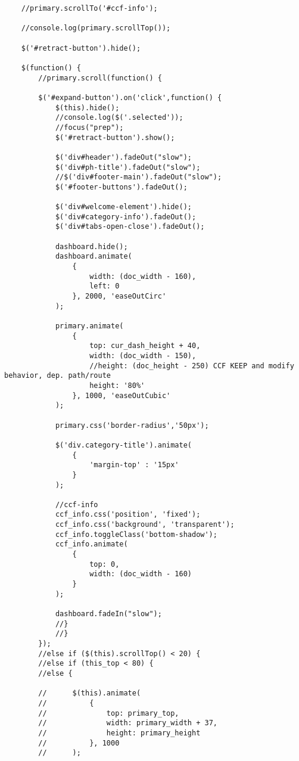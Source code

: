 \documentclass[11pt]{article}
\begin{document}
\begin{itemize}
\begin{itemize}
\begin{verbatim}
    //primary.scrollTo('#ccf-info');

    //console.log(primary.scrollTop());

    $('#retract-button').hide();

    $(function() {
        //primary.scroll(function() {

        $('#expand-button').on('click',function() {
            $(this).hide();
            //console.log($('.selected'));
            //focus("prep");
            $('#retract-button').show();

            $('div#header').fadeOut("slow");
            $('div#ph-title').fadeOut("slow");
            //$('div#footer-main').fadeOut("slow");
            $('#footer-buttons').fadeOut();

            $('div#welcome-element').hide();
            $('div#category-info').fadeOut();
            $('div#tabs-open-close').fadeOut();

            dashboard.hide();
            dashboard.animate(
                {
                    width: (doc_width - 160),
                    left: 0
                }, 2000, 'easeOutCirc'
            );

            primary.animate(
                {
                    top: cur_dash_height + 40,
                    width: (doc_width - 150),
                    //height: (doc_height - 250) CCF KEEP and modify behavior, dep. path/route
                    height: '80%' 
                }, 1000, 'easeOutCubic'
            );

            primary.css('border-radius','50px');

            $('div.category-title').animate(
                {
                    'margin-top' : '15px'
                }
            );

            //ccf-info
            ccf_info.css('position', 'fixed');
            ccf_info.css('background', 'transparent');
            ccf_info.toggleClass('bottom-shadow');
            ccf_info.animate(
                {
                    top: 0,
                    width: (doc_width - 160)
                }
            );

            dashboard.fadeIn("slow");
            //}
            //}
        });
        //else if ($(this).scrollTop() < 20) {
        //else if (this_top < 80) {
        //else {

        //      $(this).animate(
        //          {
        //              top: primary_top,
        //              width: primary_width + 37,
        //              height: primary_height
        //          }, 1000
        //      );


\end{verbatim}
\end{itemize}
\end{itemize}
\end{document}

